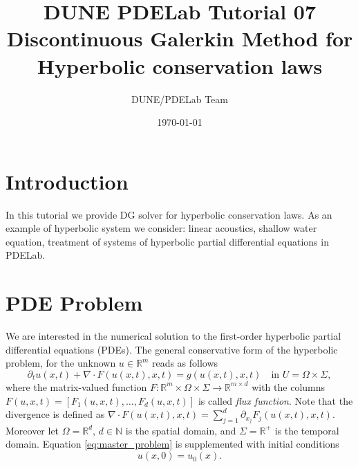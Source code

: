\documentclass[a4paper,12pt]{article}
\title{DUNE PDELab Tutorial 07 \\
Discontinuous Galerkin Method for Hyperbolic conservation laws}
\author{DUNE/PDELab Team}
\date{\today}
\theoremstyle{definition}
\theoremstyle{definition}
\newcommand{\Dim}{d}
\begin{document}
\maketitle
\tableofcontents
\clearpage

\section{Introduction}

In this tutorial we provide  DG solver for hyperbolic conservation laws. As an example of hyperbolic system we consider: linear acoustics, shallow water equation,
treatment of systems of hyperbolic partial differential equations in PDELab.

\section{PDE Problem}

We are interested in the numerical solution to the first-order
hyperbolic partial differential equations (PDEs). The general conservative form of the hyperbolic problem,  for  the unknown $u\in\mathbb{R}^m$
reads as follows
\begin{equation}
\label{eq:master_problem}
\partial_t u(x,t) + \nabla\cdot F(u(x,t),x,t) = g(u(x,t),x,t)  \quad\text{in $U=\Omega\times\Sigma$} ,
\end{equation}
where the matrix-valued function $F : \mathbb{R}^m\times\Omega\times\Sigma \to \mathbb{R}^{m\times \Dim}$
with the columns $F(u,x,t) = [F_1(u,x,t),\ldots,F_d(u,x,t)]$ is called \textit{flux function}.
Note that the divergence is defined as $\nabla\cdot F(u(x,t),x,t) = \sum_{j=1}^{\Dim} \partial_{x_j} F_j(u(x,t),x,t)$.
Moreover let $\Omega=\mathbb{R}^{\Dim}$, $\Dim\in\mathbb{N}$ is the spatial domain,  and $\Sigma=\mathbb{R}^+$ is the temporal domain. Equation \eqref{eq:master_problem} is supplemented with initial conditions
\begin{equation*}
u(x,0) = u_0(x) .
\end{equation*}
\end{document}
